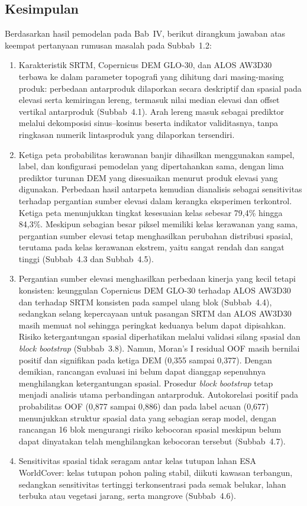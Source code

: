 \documentclass[12pt]{article}
\begin{document}
\subsection{Kesimpulan}

Berdasarkan hasil pemodelan pada Bab~IV, berikut dirangkum jawaban atas
keempat pertanyaan rumusan masalah pada Subbab~1.2:

\begin{enumerate}
\item Karakteristik SRTM, Copernicus DEM GLO-30, dan ALOS AW3D30 terbawa
ke dalam parameter topografi yang dihitung dari masing-masing produk:
perbedaan antarproduk dilaporkan secara deskriptif dan spasial pada elevasi
serta kemiringan lereng, termasuk nilai median elevasi dan offset vertikal
antarproduk (Subbab~4.1). Arah lereng masuk sebagai prediktor melalui
dekomposisi sinus--kosinus beserta indikator validitasnya, tanpa ringkasan
numerik lintasproduk yang dilaporkan tersendiri.
\item Ketiga peta probabilitas kerawanan banjir dihasilkan menggunakan sampel,
label, dan konfigurasi pemodelan yang dipertahankan sama, dengan lima
prediktor turunan DEM yang disesuaikan menurut produk elevasi yang digunakan.
Perbedaan hasil antarpeta kemudian dianalisis sebagai sensitivitas terhadap
pergantian sumber elevasi dalam kerangka eksperimen terkontrol. Ketiga peta
menunjukkan tingkat kesesuaian kelas sebesar 79,4\% hingga 84,3\%.
Meskipun sebagian besar piksel memiliki kelas kerawanan yang sama,
pergantian sumber elevasi tetap menghasilkan perubahan distribusi spasial,
terutama pada kelas kerawanan ekstrem, yaitu sangat rendah dan sangat tinggi
(Subbab~4.3 dan Subbab~4.5).
\item Pergantian sumber elevasi menghasilkan perbedaan kinerja yang kecil
tetapi konsisten: keunggulan Copernicus DEM GLO-30 terhadap ALOS AW3D30 dan
terhadap SRTM konsisten pada sampel ulang blok (Subbab~4.4), sedangkan
selang kepercayaan untuk pasangan SRTM dan ALOS AW3D30 masih memuat nol
sehingga peringkat keduanya belum dapat dipisahkan. Risiko ketergantungan
spasial diperhatikan melalui validasi silang spasial dan \textit{block bootstrap}
(Subbab~3.8). Namun, Moran's I residual OOF masih bernilai positif dan
signifikan pada ketiga DEM (0,355 sampai 0,377). Dengan demikian, rancangan
evaluasi ini belum dapat dianggap sepenuhnya menghilangkan ketergantungan
spasial. Prosedur \textit{block bootstrap} tetap menjadi analisis utama perbandingan
antarproduk.
Autokorelasi positif pada probabilitas OOF (0,877 sampai 0,886) dan pada label
acuan (0,677) menunjukkan struktur spasial data yang sebagian serap model,
dengan rancangan 16 blok mengurangi risiko kebocoran spasial meskipun belum
dapat dinyatakan telah menghilangkan kebocoran tersebut (Subbab~4.7).
\item Sensitivitas spasial tidak seragam antar kelas tutupan lahan ESA
WorldCover: kelas tutupan pohon paling stabil, diikuti kawasan terbangun,
sedangkan sensitivitas tertinggi terkonsentrasi pada semak belukar, lahan
terbuka atau vegetasi jarang, serta mangrove (Subbab~4.6).
\end{enumerate}
\end{document}
